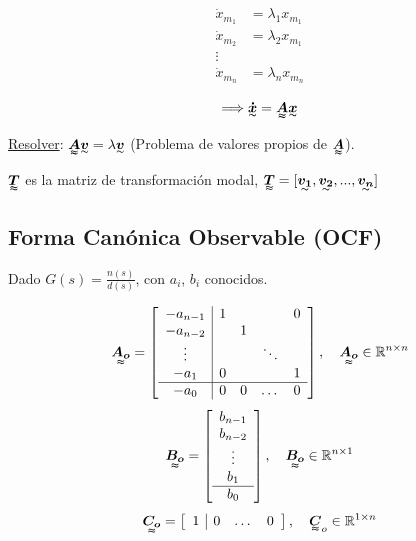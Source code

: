 \begin{align*}
    \dot{x}_{m_1} &= \lambda_1x_{m_1}\\
    \dot{x}_{m_2} &= \lambda_2x_{m_1}\\
    \vdots \\
    \dot{x}_{m_n} &= \lambda_nx_{m_n}
\end{align*}

\begin{align*}
    \Longrightarrow\tend{\dot{x}}=\tenq{A}\tend{x}
\end{align*}

\underline{Resolver}: $\tenq{A}\tend{v}=\lambda \tend{v}$ (Problema de valores propios de $\tenq{A}$).\\
\par $\tenq{T}$ es la matriz de transformación modal, $\tenq{T}=[\tend{v_1},\tend{v_2},...,\tend{v_n}]$\\

\subsection{Forma Canónica Observable (OCF)}
Dado $G(s)=\frac{n(s)}{d(s)}$, con $a_i$, $b_i$ conocidos.

\begin{align*}
\tenq{A_o}=\left[
    \begin{array}{c|cccc}
     -a_{n-1} & 1 & & & 0 \\ 
     -a_{n-2} & & 1 & & \\
     \vdots   & & & \ddots & \\
     -a_1     & 0 & & & 1 \\ \hline
     -a_0     & 0 & 0 & \dots & 0   
    \end{array}\right], \quad \tenq{A_o}\in \mathbb{R}^{n\times n}
\end{align*}
\begin{align*}
\tenq{B_o}=\left[
    \begin{array}{c}
     b_{n-1} \\
     b_{n-2}\\
    \vdots\\
     b_1 \\ \hline
     b_0
    \end{array}\right], \quad \tenq{B_o}\in \mathbb{R}^{n\times 1}
\end{align*}
\begin{align*}
\tenq{C_o}=\left[
    \begin{array}{c|ccc}
     1 & 0 & \dots & 0
    \end{array}\right], \quad \tenq{C}_o\in \mathbb{R}^{1\times n}
\end{align*}

